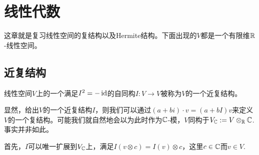 \chapter{线性代数}

这章就是复习线性空间的复结构以及Hermite结构。下面出现的$V$都是一个有限维$\mathbb{R}$-线性空间。

\section{近复结构}

\begin{para}[近复结构]
线性空间$V$上的一个满足$I^2=-\operatorname{id}$的自同构$I:V\to V$被称为$V$的一个近复结构。
\end{para}

显然，给出$V$的一个近复结构$I$，则我们可以通过$(a+bi)\cdot v=(a+bI)v$来定义$V$的一个复结构。可能我们就自然地会以为此时作为$\mathbb{C}$-模，$V$同构于$V_{\mathbb{C}}:=V\otimes_{\mathbb{R}} \mathbb{C}$. 事实并非如此。

首先，$I$可以唯一扩展到$V_{\mathbb{C}}$上，满足$I(v\otimes c)=I(v)\otimes c$，这里$c\in \mathbb{C}$而$v\in V$.

